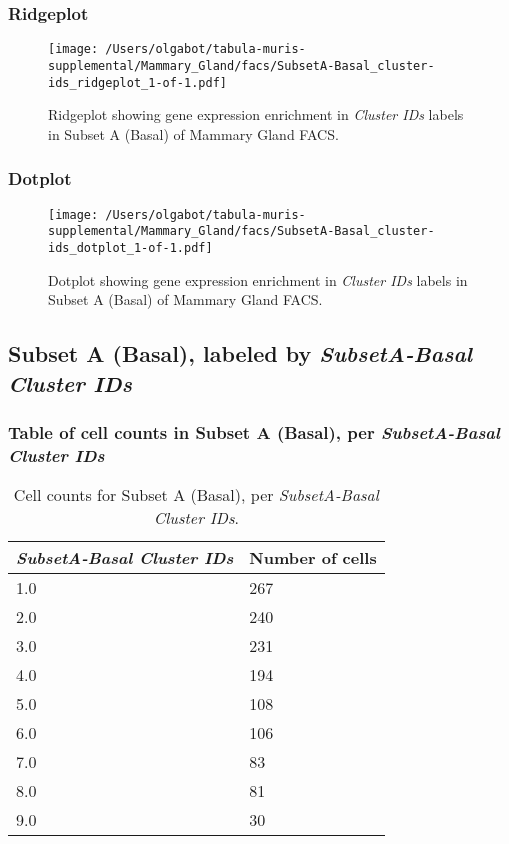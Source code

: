\clearpage

\subsubsection{Ridgeplot}
\begin{figure}[h]
\centering
\texttt{[image: /Users/olgabot/tabula-muris-supplemental/Mammary\_Gland/facs/SubsetA-Basal\_cluster-ids\_ridgeplot\_1-of-1.pdf]}

\caption{ Ridgeplot  showing gene expression enrichment in \emph{Cluster IDs} labels in Subset A (Basal) of Mammary Gland FACS. }
\end{figure}


\clearpage

\subsubsection{Dotplot}
\begin{figure}[h]
\centering
\texttt{[image: /Users/olgabot/tabula-muris-supplemental/Mammary\_Gland/facs/SubsetA-Basal\_cluster-ids\_dotplot\_1-of-1.pdf]}

\caption{ Dotplot  showing gene expression enrichment in \emph{Cluster IDs} labels in Subset A (Basal) of Mammary Gland FACS. }
\end{figure}


\clearpage

\subsection{Subset A (Basal), labeled by \emph{SubsetA-Basal Cluster IDs}}
\subsubsection{Table of cell counts in Subset A (Basal), per \emph{SubsetA-Basal Cluster IDs}}\begin{table}[h]
\centering
\label{my-label}
\begin{tabular}{@{}ll@{}}
\toprule

\emph{SubsetA-Basal Cluster IDs}& Number of cells \\ \midrule
1.0 & 267 \\

2.0 & 240 \\

3.0 & 231 \\

4.0 & 194 \\

5.0 & 108 \\

6.0 & 106 \\

7.0 & 83 \\

8.0 & 81 \\

9.0 & 30 \\
\bottomrule
\end{tabular}
\caption{Cell counts for Subset A (Basal), per \emph{SubsetA-Basal Cluster IDs}.}
\end{table}

